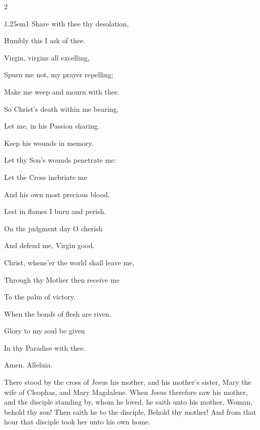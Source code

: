 \begin{multicols}{2}
\begin{hangparas}{1.25em}{1}
Share with thee thy desolation,

Humbly this I ask of thee.

\vspace{0.5\baselineskip}

Virgin, virgins all excelling,

Spurn me not, my prayer repelling;

Make me weep and mourn with thee.

\vspace{0.5\baselineskip}

So Christ's death within me bearing,

Let me, in his Passion sharing.

Keep his wounds in memory.

\vspace{0.5\baselineskip}

Let thy Son's wounds penetrate me:

Let the Cross inebriate me

And his own most precious blood.

\vspace{0.5\baselineskip}

Lest in flames I burn and perish.

On the judgment day O cherish

And defend me, Virgin good.

\vspace{0.5\baselineskip}

Christ, whene'er the world shall leave me,

Through thy Mother then receive me

To the palm of victory.

\vspace{0.5\baselineskip}

When the bonds of flesh are riven.

Glory to my soul be given

In thy Paradise with thee.

Amen. Alleluia.
\end{hangparas}
\end{multicols}

 There stood by the cross of Jesus his mother, and his mother's sister, Mary the wife of Cleophas, and Mary Magdalene. When Jesus therefore saw his mother, and the disciple standing by, whom he loved, he saith unto his mother, Woman, behold thy son! Then saith he to the disciple, Behold thy mother! And from that hour that disciple took her unto his own home.

